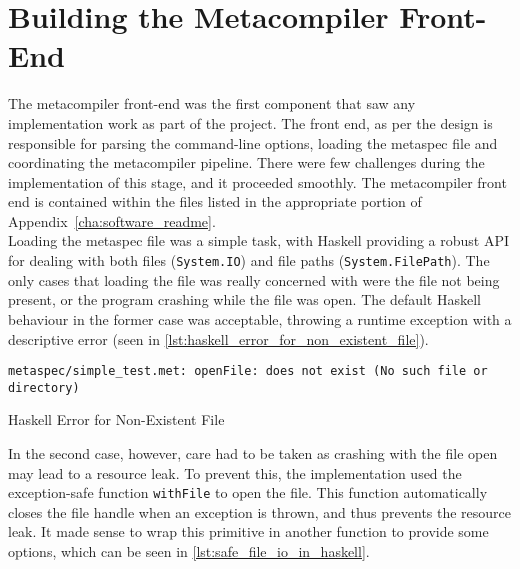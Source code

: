 

\section{Building the Metacompiler Front-End} %
\label{sec:building_the_metacompiler_front_end}
The metacompiler front-end was the first component that saw any implementation work as part of the project. 
The front end, as per the design is responsible for parsing the command-line options, loading the metaspec file and coordinating the metacompiler pipeline.
There were few challenges during the implementation of this stage, and it proceeded smoothly.
The metacompiler front end is contained within the files listed in the appropriate portion of Appendix~\ref{cha:software_readme}.\\

Loading the metaspec file was a simple task, with Haskell providing a robust API for dealing with both files (\texttt{System.IO}) and file paths (\texttt{System.FilePath}). 
The only cases that loading the file was really concerned with were the file not being present, or the program crashing while the file was open.
The default Haskell behaviour in the former case was acceptable, throwing a runtime exception with a descriptive error (seen in \autoref{lst:haskell_error_for_non_existent_file}).\\

\begin{listing}[!htb]
\begin{verbatim}
metaspec/simple_test.met: openFile: does not exist (No such file or directory)
\end{verbatim}
\caption{Haskell Error for Non-Existent File}
\label{lst:haskell_error_for_non_existent_file}
\end{listing}

In the second case, however, care had to be taken as crashing with the file open may lead to a resource leak. 
To prevent this, the implementation used the exception-safe function \texttt{withFile} to open the file.
This function automatically closes the file handle when an exception is thrown, and thus prevents the resource leak.
It made sense to wrap this primitive in another function to provide some options, which can be seen in \autoref{lst:safe_file_io_in_haskell}.

